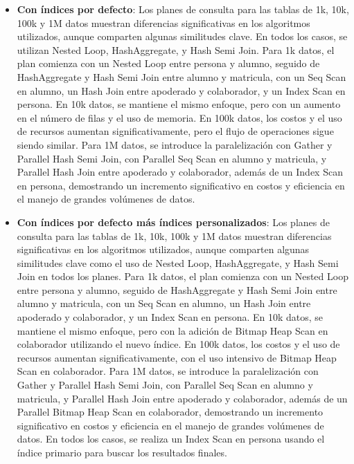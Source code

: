 \begin{itemize}
\begin{itemize}
            \item {\textbf{Con índices por defecto}: Los planes de consulta para las tablas de 1k, 10k, 100k y 1M datos muestran diferencias significativas en los algoritmos utilizados, aunque comparten algunas similitudes clave. En todos los casos, se utilizan Nested Loop, HashAggregate, y Hash Semi Join. Para 1k datos, el plan comienza con un Nested Loop entre persona y alumno, seguido de HashAggregate y Hash Semi Join entre alumno y matricula, con un Seq Scan en alumno, un Hash Join entre apoderado y colaborador, y un Index Scan en persona. En 10k datos, se mantiene el mismo enfoque, pero con un aumento en el número de filas y el uso de memoria. En 100k datos, los costos y el uso de recursos aumentan significativamente, pero el flujo de operaciones sigue siendo similar. Para 1M datos, se introduce la paralelización con Gather y Parallel Hash Semi Join, con Parallel Seq Scan en alumno y matricula, y Parallel Hash Join entre apoderado y colaborador, además de un Index Scan en persona, demostrando un incremento significativo en costos y eficiencia en el manejo de grandes volúmenes de datos.}
            \item {\textbf{Con índices por defecto más índices personalizados}: Los planes de consulta para las tablas de 1k, 10k, 100k y 1M datos muestran diferencias significativas en los algoritmos utilizados, aunque comparten algunas similitudes clave como el uso de Nested Loop, HashAggregate, y Hash Semi Join en todos los planes. Para 1k datos, el plan comienza con un Nested Loop entre persona y alumno, seguido de HashAggregate y Hash Semi Join entre alumno y matricula, con un Seq Scan en alumno, un Hash Join entre apoderado y colaborador, y un Index Scan en persona. En 10k datos, se mantiene el mismo enfoque, pero con la adición de Bitmap Heap Scan en colaborador utilizando el nuevo índice. En 100k datos, los costos y el uso de recursos aumentan significativamente, con el uso intensivo de Bitmap Heap Scan en colaborador. Para 1M datos, se introduce la paralelización con Gather y Parallel Hash Semi Join, con Parallel Seq Scan en alumno y matricula, y Parallel Hash Join entre apoderado y colaborador, además de un Parallel Bitmap Heap Scan en colaborador, demostrando un incremento significativo en costos y eficiencia en el manejo de grandes volúmenes de datos. En todos los casos, se realiza un Index Scan en persona usando el índice primario para buscar los resultados finales.}
      \end{itemize}
\end{itemize}

